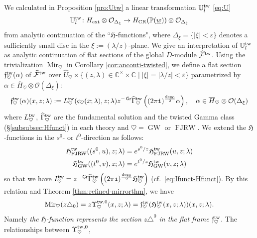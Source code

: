 \documentclass[11pt]{amsart}
\theoremstyle{definition} %
\theoremstyle{remark} %
\newcommand{\CC}{\mathbb C}
\newcommand{\PP}{\mathbb P}
\newcommand{\UU}{\mathbb U}
\newcommand{\tw}{{\rm tw}}
\def\GW{\operatorname{\text{GW}}}
\def\CR{\operatorname{\text{CR}}}
\newcommand{\cO}{\mathcal{O}}
\newcommand{\cF}{\mathcal{F}}
\newcommand{\hcF}{\widehat{\cF}}
\newcommand{\frf}{\mathfrak{f}}
\newcommand{\ext}{{\operatorname{ext}}}
\newcommand{\FJRW}{{\operatorname{FJRW}}}
\renewcommand{\GW}{{\operatorname{GW}}}
\renewcommand{\CR}{{\operatorname{CR}}}
\newcommand{\grading}{\operatorname{\mathsf{Gr}}} %
\newcommand{\Mir}{\operatorname{Mir}}
\newcommand{\hGamma}{\widehat{\Gamma}}
\newcommand{\hU}{\widehat{U}}
\newcommand{\ov}{\overline}
\newcommand{\iu}{\mathtt{i}}
\newcommand{\Hf}{{\mathfrak{H}}}
\newcommand{\uw}{\underline{w}}
\begin{document}
We calculated in Proposition \ref{pro:Utw} 
a linear transformation $\UU^\tw_l$ \eqref{eq:U}
\[
\UU^{\tw}_l\colon 
H_{\ext}\otimes \cO_{\Delta_\xi}  
\to H_{\CR}(\PP(\uw))\otimes \cO_{\Delta_\xi}
\]
from analytic continuation of the ``$\Hf$-functions", 
where $\Delta_\xi=\{|\xi|< \varepsilon\}$ 
denotes a sufficiently small disc in the 
$\xi:= (\lambda/z)$-plane. 
We give an interpretation of $\UU^{\tw}_l$ as 
analytic continuation of flat sections 
of the global $D$-module $\hcF^\tw$. 
Using the trivialization $\Mir_\heartsuit$ 
in Corollary \ref{cor:anconti-twisted}, 
we define a flat section $\frf^\tw_\heartsuit(\alpha)$ of 
$\hcF^\tw$ over $\hU_\heartsuit 
\times \{(z,\lambda)\in \CC^\times \times \CC\;|\; 
|\xi| = |\lambda/z| < \varepsilon\}$ 
parametrized by $\alpha\in \ov{H}_\heartsuit \otimes \cO(\Delta_\xi)$: 
\begin{equation} 
\label{eq:flatsec-tw}
\frf^\tw_\heartsuit(\alpha)(x,z;\lambda) 
:= L^\tw_{\heartsuit}(\varsigma_\heartsuit(x;\lambda),z;\lambda) z^{-\grading} 
\hGamma^\tw_\heartsuit \left((2\pi\iu)^{\frac{\deg_0}{2}} \alpha \right), 
\quad \alpha \in \ov{H}_\heartsuit \otimes \cO(\Delta_\xi)   
\end{equation} 
where $L^\tw_\heartsuit$, $\hGamma^\tw_\heartsuit$ are the 
fundamental solution and the twisted Gamma class 
(\S \ref{subsubsec:Hfunct}) in each theory 
and $\heartsuit = \GW \text{ or } \FJRW$. 
We extend the $\Hf$-functions in the $s^0$- or $t^0$-direction as follows: 
\begin{align*} 
\Hf^\tw_{\FJRW}((s^0,u),z;\lambda) 
&= e^{s^0/z} \Hf^{\tw}_{\FJRW}(u,z;\lambda)  \\
\Hf^\tw_{\GW}((t^0,v),z;\lambda) 
&= e^{t^0/z} \Hf^{\tw}_{\GW}(v,z;\lambda) 
\end{align*} 
so that we have $I^\tw_\heartsuit = z^{-\grading} \hGamma_\heartsuit^\tw 
\left ((2\pi\iu)^{\frac{\deg_0}{2}} \Hf^\tw_\heartsuit\right)$ 
(cf.\ \eqref{eq:Ifunct-Hfunct}). 
By this relation and Theorem \ref{thm:refined-mirrorthm}, 
we have  
\begin{equation} 
\label{eq:Hfcn-meaning}
\Mir_\heartsuit(z \triangle_0) =  
z\Upsilon^{\tw,0}_{\heartsuit}(x,z;\lambda) 
=  \frf^\tw_{\heartsuit}
(\Hf^\tw_{\heartsuit}(x,z;\lambda))(x,z;\lambda). 
\end{equation} 
Namely \emph{the $\Hf$-function represents the section 
$z \triangle^0$ in the flat frame $\frf^{\tw}_\heartsuit$}. 
The relationships between $\Upsilon^{\tw,0}_\heartsuit$, 
\end{document}
